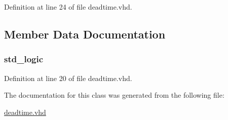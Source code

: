 Definition at line 24 of file deadtime.\+vhd.



\subsection{Member Data Documentation}
\hypertarget{classdeadtime_1_1deadtime__archetecture_a90c7671dbb1af7d80f90cd96262cda3b}{}
\subsubsection[{sig\+\_\+\+Not\+\_\+\+Pwm\+\_\+\+In}]{ {\bfseries \textcolor{comment}{std\+\_\+logic}\textcolor{vhdlchar}{ }} \hspace{0.3cm}{\ttfamily [Signal]}}\label{classdeadtime_1_1deadtime__archetecture_a90c7671dbb1af7d80f90cd96262cda3b}


Definition at line 20 of file deadtime.\+vhd.



The documentation for this class was generated from the following file\+:\begin{DoxyCompactItemize}
\item 
\hyperlink{deadtime_8vhd}{deadtime.\+vhd}\end{DoxyCompactItemize}
